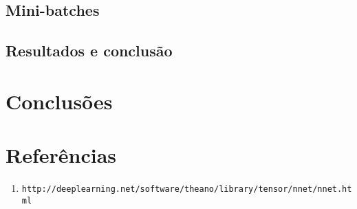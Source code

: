 \documentclass[11pt]{article}
\begin{document}
\subsection*{Mini-batches}

\subsection{Resultados e conclusão}

\section{Conclusões}

\section{Referências}

\begin{enumerate}
	\item \texttt{http://deeplearning.net/software/theano/library/tensor/nnet/nnet.html}
\end{enumerate}
\end{document}
